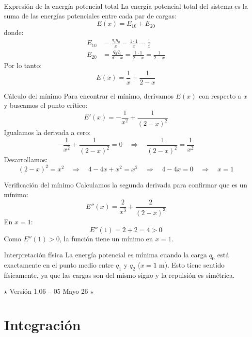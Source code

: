\documentclass[12pt, a4paper]{article}
\theoremstyle{rioplatense}
\begin{document}

\begin{paragraph}{Expresión de la energía potencial total}
La energía potencial total del sistema es la suma de las energías potenciales entre cada par de cargas:
$$
E(x) = E_{10} + E_{20}
$$
donde:
\begin{align*}
E_{10} &= \frac{q_1 q_0}{x} = \frac{1 \cdot 1}{x} = \frac{1}{x} \\
E_{20} &= \frac{q_2 q_0}{d - x} = \frac{1 \cdot 1}{2 - x} = \frac{1}{2 - x}
\end{align*}
Por lo tanto:
$$
E(x) = \frac{1}{x} + \frac{1}{2 - x}
$$
\end{paragraph}

\begin{paragraph}{Cálculo del mínimo}
Para encontrar el mínimo, derivamos \( E(x) \) con respecto a \( x \) y buscamos el punto crítico:
$$
E'(x) = -\frac{1}{x^2} + \frac{1}{(2 - x)^2}
$$
Igualamos la derivada a cero:
$$
-\frac{1}{x^2} + \frac{1}{(2 - x)^2} = 0
\quad \Rightarrow \quad
\frac{1}{(2 - x)^2} = \frac{1}{x^2}
$$
Desarrollamos:
$$
(2 - x)^2 = x^2
\quad \Rightarrow \quad
4 - 4x + x^2 = x^2
\quad \Rightarrow \quad
4 - 4x = 0
\quad \Rightarrow \quad
x = 1
$$
\end{paragraph}

\begin{paragraph}{Verificación del mínimo}
Calculamos la segunda derivada para confirmar que es un mínimo:
$$
E''(x) = \frac{2}{x^3} + \frac{2}{(2 - x)^3}
$$
En \( x = 1 \):
$$
E''(1) = 2 + 2 = 4 > 0
$$
Como \( E''(1) > 0 \), la función tiene un mínimo en \( x = 1 \).
\end{paragraph}

\begin{paragraph}{Interpretación física}
La energía potencial es mínima cuando la carga \( q_0 \) está exactamente en el punto medio entre \( q_1 \) y \( q_2 \) (\( x = 1 \) m). Esto tiene sentido físicamente, ya que las cargas son del mismo signo y la repulsión es simétrica.
\end{paragraph}

\begin{center}
$\star$
Versión 1.06 -- 05 Mayo 26
$\star$
\end{center}

\newpage

\section{Integración}
\end{document}
